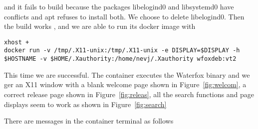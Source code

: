 \documentclass[a4paper]{article}  %
\begin{document}
and it fails to build because the packages libelogind0 and libsystemd0 have conflicts and apt refuses to install both. We choose to delete libelogind0. 
Then the build works , and we are able to run its docker image with
\begin{tcolorbox}
\begin{verbatim}
xhost +
docker run -v /tmp/.X11-unix:/tmp/.X11-unix -e DISPLAY=$DISPLAY -h $HOSTNAME -v $HOME/.Xauthority:/home/nevj/.Xauthority wfoxdeb:vt2
\end{verbatim}
\end{tcolorbox}
This time we are successful. The container executes the Waterfox binary and we ger an X11 window with a blank welcome page shown in Figure~\ref{fig:welcom}, a correct release page shown in Figure~\ref{fig:releas}, all the search functions and page displays seem to work as shown in Figure~\ref{fig:search}



There are messages in the container terminal as follows
\end{document}
